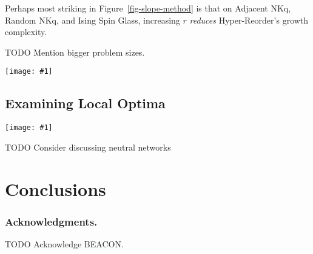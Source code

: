 \documentclass[runningheads,a4paper]{llncs}
\newcommand{\includegraphicsfit}[1]
{\texttt{[image: \#1]}}
\begin{document}
Perhaps most striking in Figure~\ref{fig-slope-method} is that on Adjacent NKq, Random NKq,
and Ising Spin Glass, increasing $r$ \emph{reduces} Hyper-Reorder's growth complexity.

TODO Mention bigger problem sizes.


\begin{figure*}
  \centering
  \includegraphicsfit{slope-method}
  \caption{Estimated slope with 95\% confidence intervals for each method to find $r$-bit local optima. Slope is $m$ in the model $y = 2^c2^{mN}$
           where $y$ is number of seconds required to
	         find all local optima of a problem using $N$ bits.}
  \label{fig-slope-method}
\end{figure*}


\subsection{Examining Local Optima}

\begin{figure*}
  \centering
  \includegraphicsfit{length-radius}
  \caption{Number of $r$-bit local optima as $N$ increases for each problem.}
  \label{fig-length-radius}
\end{figure*}


TODO Consider discussing neutral networks

\section{Conclusions}

\subsubsection*{Acknowledgments.} TODO Acknowledge BEACON.



\end{document}
